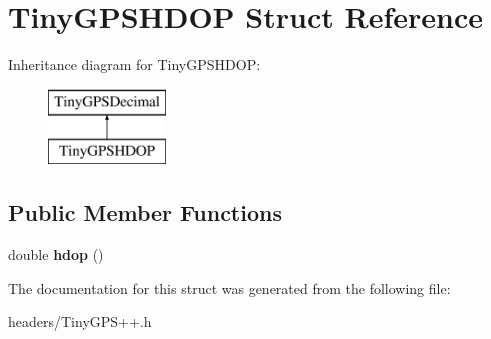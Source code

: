\section{Tiny\+G\+P\+S\+H\+D\+OP Struct Reference}
\label{struct_tiny_g_p_s_h_d_o_p}
Inheritance diagram for Tiny\+G\+P\+S\+H\+D\+OP\+:\begin{figure}[H]
\begin{center}
\leavevmode
\includegraphics[height=2.000000cm]{struct_tiny_g_p_s_h_d_o_p}
\end{center}
\end{figure}
\subsection*{Public Member Functions}
\begin{DoxyCompactItemize}
\item 
double {\bfseries hdop} ()\label{struct_tiny_g_p_s_h_d_o_p_a27cd35588c96eefb690bba46497d20d7}

\end{DoxyCompactItemize}


The documentation for this struct was generated from the following file\+:\begin{DoxyCompactItemize}
\item 
headers/Tiny\+G\+P\+S++.\+h\end{DoxyCompactItemize}
